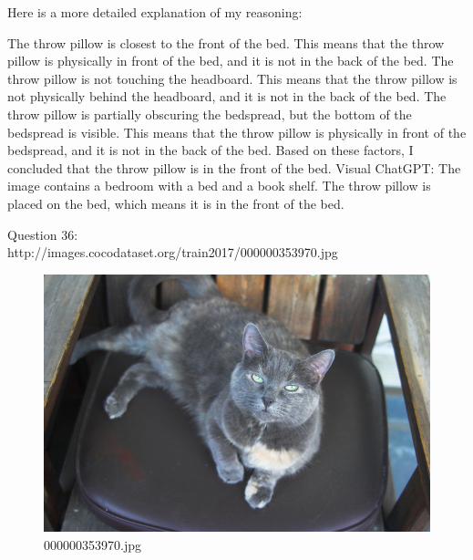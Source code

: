 \begin{enumerate}
        Here is a more detailed explanation of my reasoning:
        
        The throw pillow is closest to the front of the bed. This means that the throw pillow is physically in front of the bed, and it is not in the back of the bed.
        The throw pillow is not touching the headboard. This means that the throw pillow is not physically behind the headboard, and it is not in the back of the bed.
        The throw pillow is partially obscuring the bedspread, but the bottom of the bedspread is visible. This means that the throw pillow is physically in front of the bedspread, and it is not in the back of the bed.
        Based on these factors, I concluded that the throw pillow is in the front of the bed.
        \subitem Visual ChatGPT: The image contains a bedroom with a bed and a book shelf. The throw pillow is placed on the bed, which means it is in the front of the bed.
    \end{enumerate}
    Question 36:\\http://images.cocodataset.org/train2017/000000353970.jpg
    \begin{figure}[h]
        \centering
        \includegraphics[width=0.8\linewidth]{../image set/easy/000000353970.jpg}
        \caption{000000353970.jpg}
    \end{figure}
